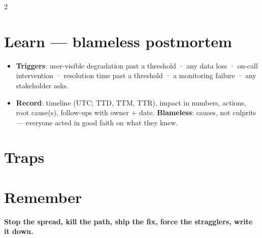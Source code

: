 \documentclass[8pt]{extarticle}
\begin{document}
\begin{multicols}{2}
\section{Learn — blameless postmortem}
\begin{itemize}
  \item \textbf{Triggers}: user-visible degradation past a threshold · any data loss · on-call intervention
        · resolution time past a threshold · a monitoring failure · any stakeholder asks.
  \item \textbf{Record}: timeline (UTC; TTD, TTM, TTR), impact in numbers, actions, root cause(s), follow-ups with
        owner + date. \textbf{Blameless}: causes, not culprits — everyone acted in good faith on what they knew.
\end{itemize}

\section{Traps}
\begin{itemize}
\end{itemize}

\section{Remember}
\textbf{Stop the spread, kill the path, ship the fix, force the stragglers, write it down.}

\end{multicols}

\end{document}
